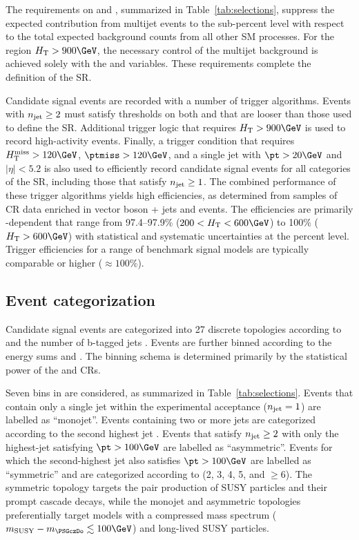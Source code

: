 The requirements on \alphat and \bdphi, summarized in
Table~\ref{tab:selections}, suppress the expected contribution from
multijet events to the sub-percent level with respect to the total
expected background counts from all other SM processes. For the
region $\scalht > 900\GeV$, the necessary control of the multijet
background is achieved solely with the \bdphi and \bdphimod
variables. These requirements complete the definition of the SR.

Candidate signal events are recorded with a number of trigger
algorithms. Events with $\njet \geq 2$ must satisfy thresholds on both
\scalht and \alphat that are looser than those used to define the
SR. Additional trigger logic that requires $\scalht > 900\GeV$ is used
to record high-activity events. Finally, a trigger condition that
requires $\mht > 120\GeV$, $\ptmiss > 120\GeV$, and a single jet with
$\pt > 20\GeV$ and $|\eta| < 5.2$ is also used to efficiently record
candidate signal events for all categories of the SR, including those
that satisfy $\njet \geq 1$. The combined performance of these trigger
algorithms yields high efficiencies, as determined from samples of CR
data enriched in vector boson + jets and \ttbar events. The
efficiencies are primarily \scalht-dependent that range from
97.4--97.9\% ($200 < \scalht < 600\GeV$) to 100\% ($\scalht >
600\GeV$) with statistical and systematic uncertainties at the percent
level. Trigger efficiencies for a range of benchmark signal models are
typically comparable or higher (${\approx}100\%$).


\subsection{Event categorization}
\label{sec:categorization}

Candidate signal events are categorized into 27 discrete topologies
according to \njet and the number of b-tagged jets \nb. Events are
further binned according to the energy sums \scalht and \mht. The
binning schema is determined primarily by the statistical power of the
\mj and \mmj CRs.

Seven bins in \njet are considered, as summarized in
Table~\ref{tab:selections}. Events that contain only a single jet
within the experimental acceptance ($\njet = 1$) are labelled as
``monojet''. Events containing two or more jets are categorized
according to the second highest jet \pt. Events that satisfy $\njet
\geq 2$ with only the highest-\pt jet satisfying $\pt > 100\GeV$ are
labelled as ``asymmetric''. Events for which the second-highest jet
\pt also satisfies $\pt > 100\GeV$ are labelled as ``symmetric'' and
are categorized according to \njet (2, 3, 4, 5, and ${\geq}6$). The
symmetric topology targets the pair production of SUSY particles and
their prompt cascade decays, while the monojet and asymmetric
topologies preferentially target models with a compressed mass
spectrum ($m_\text{SUSY} - m_{\PSGczDo} \lesssim 100\GeV$) and
long-lived SUSY particles.

